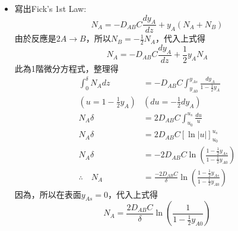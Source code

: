 \documentclass[../main.tex]{subfiles}
\begin{document}
\begin{itemize}
\begin{itemize}
\begin{figure}[H]
      \caption{non-homogeneous reaction simplification}
    \end{figure}
    因反應在觸媒表面發生，A會被消耗，於氣相中產生濃度差，產生質傳\\
    而反應生成了B，B與氣相也產生濃度差，產生質傳
    \item 寫出Fick's 1st Law:
      \begin{equation}
        N_A = -D_{AB}C\frac{d y_A}{dz}+ y_A(N_A + N_B)
      \end{equation}
      由於反應是$2A \rightarrow B$，所以$N_B = -\frac{1}{2}N_A$，代入上式得
      \begin{equation}
        N_A = -D_{AB}C\frac{d y_A}{dz}+ \frac{1}{2}y_A N_A \label{eq:ch4_7_ficks_law_reaction_start}
      \end{equation}
      此為1階微分方程式，整理得
      \begin{align}
        \int_0^\delta N_A dz &= -D_{AB}C \int_{y_{A0}}^{y_{As}} \frac{dy_A}{1-\frac{1}{2}y_A} \nonumber \\
        (u=1-\frac{1}{2}y_A) & (du = -\frac{1}{2}dy_A) \nonumber\\
        N_A\delta &= 2D_{AB}C \int_{u_0}^{u_s} \frac{du}{u} \nonumber \\
        N_A\delta &= 2D_{AB}C [\ln|u|]_{u_0}^{u_s} \nonumber \\
        N_A\delta &= -2D_{AB}C \ln\left(\frac{1-\frac{1}{2}y_{As}}{1-\frac{1}{2}y_{A0}}\right) \nonumber \\
        \therefore \quad N_A &= \frac{-2D_{AB}C}{\delta}
         \ln\left(\frac{1-\frac{1}{2}y_{As}}{1-\frac{1}{2}y_{A0}}\right) \label{eq:ch4_7_ficks_law_reaction}
      \end{align}
      因為，所以在表面$y_{As}=0$，代入上式得
      \begin{equation}
        \boxed{N_A = \frac{2D_{AB}C}{\delta} \ln\left(\frac{1}{1-\frac{1}{2}y_{A0}}\right)}

\end{equation}
\end{itemize}
\end{itemize}
\end{document}
